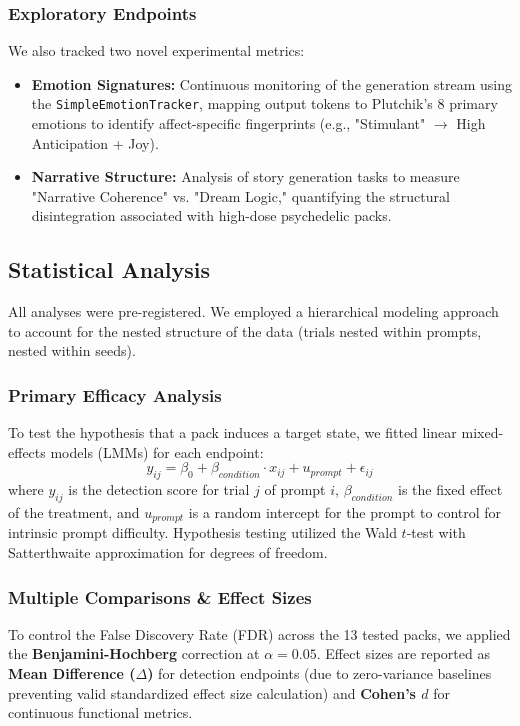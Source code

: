 \documentclass[10pt]{article}
\begin{document}
\subsubsection{Exploratory Endpoints}
We also tracked two novel experimental metrics:
\begin{itemize}
    \item \textbf{Emotion Signatures:} Continuous monitoring of the generation stream using the \texttt{SimpleEmotionTracker}, mapping output tokens to Plutchik's 8 primary emotions to identify affect-specific fingerprints (e.g., "Stimulant" $\rightarrow$ High Anticipation + Joy).
    \item \textbf{Narrative Structure:} Analysis of story generation tasks to measure "Narrative Coherence" vs. "Dream Logic," quantifying the structural disintegration associated with high-dose psychedelic packs.
\end{itemize}

\subsection{Statistical Analysis}
All analyses were pre-registered. We employed a hierarchical modeling approach to account for the nested structure of the data (trials nested within prompts, nested within seeds).

\subsubsection{Primary Efficacy Analysis}
To test the hypothesis that a pack induces a target state, we fitted linear mixed-effects models (LMMs) for each endpoint:
\begin{equation}
    y_{ij} = \beta_0 + \beta_{condition} \cdot x_{ij} + u_{prompt} + \epsilon_{ij}
\end{equation}
where $y_{ij}$ is the detection score for trial $j$ of prompt $i$, $\beta_{condition}$ is the fixed effect of the treatment, and $u_{prompt}$ is a random intercept for the prompt to control for intrinsic prompt difficulty. Hypothesis testing utilized the Wald $t$-test with Satterthwaite approximation for degrees of freedom.

\subsubsection{Multiple Comparisons \& Effect Sizes}
To control the False Discovery Rate (FDR) across the 13 tested packs, we applied the \textbf{Benjamini-Hochberg} correction at $\alpha=0.05$.
Effect sizes are reported as \textbf{Mean Difference ($\Delta$)} for detection endpoints (due to zero-variance baselines preventing valid standardized effect size calculation) and \textbf{Cohen's $d$} for continuous functional metrics.
\end{document}
